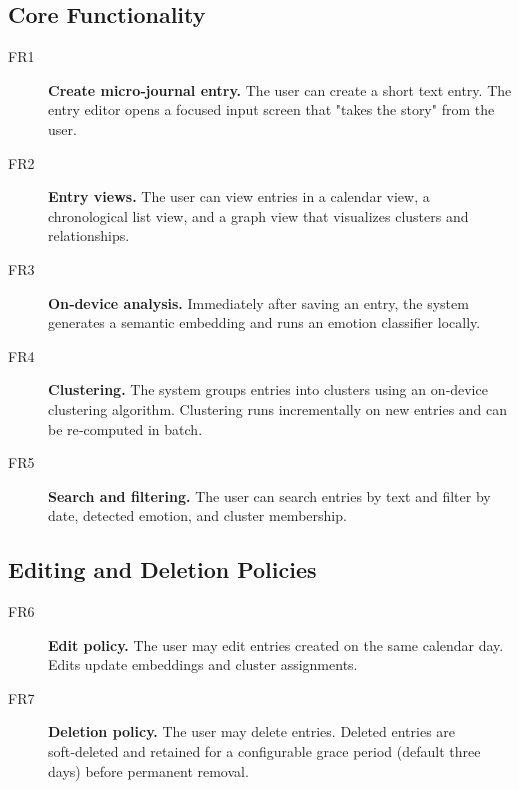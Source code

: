 \subsection{Core Functionality}
\begin{description}
  \item[FR1] \textbf{Create micro‑journal entry.} The user can create a short text entry. The entry editor opens a focused input screen that "takes the story" from the user.
  \item[FR2] \textbf{Entry views.} The user can view entries in a calendar view, a chronological list view, and a graph view that visualizes clusters and relationships.
  \item[FR3] \textbf{On‑device analysis.} Immediately after saving an entry, the system generates a semantic embedding and runs an emotion classifier locally.
  \item[FR4] \textbf{Clustering.} The system groups entries into clusters using an on‑device clustering algorithm. Clustering runs incrementally on new entries and can be re‑computed in batch.
  \item[FR5] \textbf{Search and filtering.} The user can search entries by text and filter by date, detected emotion, and cluster membership.
\end{description}

\subsection{Editing and Deletion Policies}
\begin{description}
  \item[FR6] \textbf{Edit policy.} The user may edit entries created on the same calendar day. Edits update embeddings and cluster assignments.
  \item[FR7] \textbf{Deletion policy.} The user may delete entries. Deleted entries are soft‑deleted and retained for a configurable grace period (default three days) before permanent removal.
\end{description}

